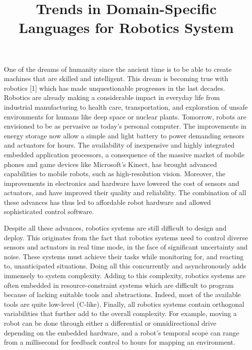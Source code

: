 \documentclass[book]{apa}
\title{Trends in Domain-Specific Languages for Robotics System}
\begin{document}
\maketitle
One of the dreams of humanity since the ancient time is to be able to create machines that are skilled and intelligent.
This dream is becoming true with robotics [1] which has made unquestionable progresses in the last decades.
Robotics are already making a considerable impact in everyday life from industrial manufacturing to health care, transportation, and exploration of unsafe environments for humans like deep space or nuclear plants.
Tomorrow, robots are envisioned to be as pervasive as today’s personal computer. The improvements in energy storage now allow a simple and light battery to power demanding sensors and actuators for hours. The availability of inexpensive and highly integrated embedded application processors, a consequence of the massive market of mobile phones and game devices like Microsoft’s Kinect, has brought advanced capabilities to mobile robots, such as high-resolution vision. Moreover, the improvements in electronics and hardware have lowered the cost of sensors and actuators, and have improved their quality and reliability. The combination of all these advances has thus led to affordable robot hardware and allowed sophisticated control software. 

Despite all these advances, robotics systems are still difficult to design and deploy. This originates from the fact that robotics systems need to control diverse sensors and actuators in real time mode, in the face of significant uncertainty and noise. These systems must achieve their tasks while monitoring for, and reacting to, unanticipated situations. Doing all this concurrently and asynchronously adds immensely to system complexity. Adding to this complexity, robotics systems are often embedded in resource-constraint systems which are difficult to program because of lacking suitable tools and abstractions. Indeed, most of the available tools are quite low-level (C-like). Finally, all robotics systems contain orthogonal variabilities that further add to the overall complexity. For example, moving a robot can be done through either a differential or omnidirectional drive depending on the embedded hardware, and a robot’s temporal scope can range from a millisecond for feedback control to hours for mapping an environment.
\end{document}
